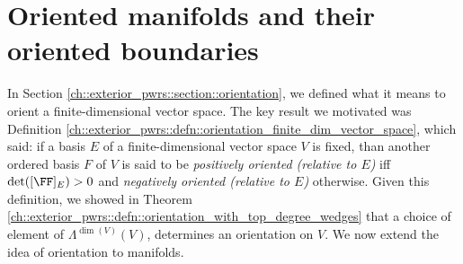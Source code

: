 
\newpage

\section{Oriented manifolds and their oriented boundaries}

In Section \ref{ch::exterior_pwrs::section::orientation}, we defined what it means to orient a finite-dimensional vector space. The key result we motivated was Definition \ref{ch::exterior_pwrs::defn::orientation_finite_dim_vector_space}, which said: if a basis $E$ of a finite-dimensional vector space $V$ is fixed, than another ordered basis $F$ of $V$ is said to be \textit{positively oriented (relative to $E$)} iff $\det([\FF]_E) > 0$ and \textit{negatively oriented (relative to $E$)} otherwise. Given this definition, we showed in Theorem \ref{ch::exterior_pwrs::defn::orientation_with_top_degree_wedges} that a choice of element of $\Lambda^{\dim(V)}(V)$, determines an orientation on $V$. We now extend the idea of orientation to manifolds.

